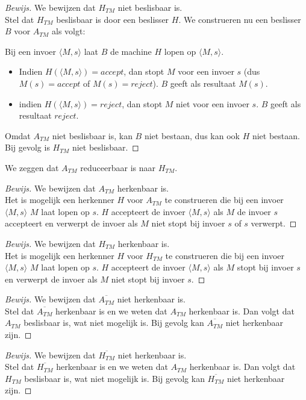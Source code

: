 \documentclass[a4paper]{article}
\newenvironment{bewijs}[1]%
  {\begin{mdframed}[topline=true,
    rightline=true,
    leftline=true,
    bottomline=true]\begin{proof}[Bewijs]#1\\[.2cm]\normalfont}%
  {\end{proof}\end{mdframed}}
\newcommand{\atm}{\ensuremath{{A_{TM}}}}
\newcommand{\htm}{\ensuremath{{H_{TM}}}}
\begin{document}
\begin{bewijs}{We bewijzen dat $\htm$ niet beslisbaar is.}
Stel dat $\htm$ beslisbaar is door een beslisser $H$. We construeren nu een beslisser $B$ voor $\atm$ als volgt:

Bij een invoer $\langle M,s \rangle$ laat $B$ de machine $H$ lopen op $\langle M,s \rangle$.
\begin{itemize}
\item Indien $H(\langle M,s \rangle) = accept$, dan stopt $M$ voor een invoer $s$ (dus $M(s) = accept$ of $M(s) = reject$). $B$ geeft als resultaat $M(s)$.
\item indien $H(\langle M,s \rangle) = reject$, dan stopt $M$ niet voor een invoer $s$. $B$ geeft als resultaat $reject$.
\end{itemize}
Omdat $\atm$ niet beslisbaar is, kan $B$ niet bestaan, dus kan ook $H$ niet bestaan. Bij gevolg is $\htm$ niet beslisbaar.
\end{bewijs}

We zeggen dat $\atm$ reduceerbaar is naar $\htm$.

\begin{bewijs}{We bewijzen dat $\atm$ herkenbaar is.}
  Het is mogelijk een herkenner $H$ voor $\atm$ te construeren die bij een invoer $\langle M,s \rangle$ $M$ laat lopen op $s$. $H$ accepteert de invoer $\langle M,s \rangle$ als $M$ de invoer $s$ accepteert en verwerpt de invoer als $M$ niet stopt bij invoer $s$ of $s$ verwerpt.
\end{bewijs}

\begin{bewijs}{We bewijzen dat $\htm$ herkenbaar is.}
  Het is mogelijk een herkenner $H$ voor $\htm$ te construeren die bij een invoer $\langle M,s \rangle$ $M$ laat lopen op $s$. $H$ accepteert de invoer $\langle M,s \rangle$ als $M$ stopt bij invoer $s$ en verwerpt de invoer als $M$ niet stopt bij invoer $s$.
\end{bewijs}

\begin{bewijs}{We bewijzen dat $\overline{\atm}$ niet herkenbaar is.}
  Stel dat $\overline{\atm}$ herkenbaar is en we weten dat $\atm$ herkenbaar is. Dan volgt dat $\atm$ beslisbaar is, wat niet mogelijk is. Bij gevolg kan $\overline{\atm}$ niet herkenbaar zijn. 
\end{bewijs}

\begin{bewijs}{We bewijzen dat $\overline{\htm}$ niet herkenbaar is.}
  Stel dat $\overline{\htm}$ herkenbaar is en we weten dat $\atm$ herkenbaar is. Dan volgt dat $\htm$ beslisbaar is, wat niet mogelijk is. Bij gevolg kan $\overline{\htm}$ niet herkenbaar zijn. 
\end{bewijs}
\end{document}
